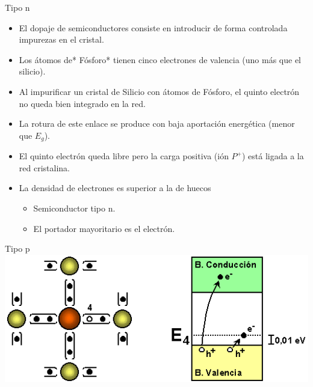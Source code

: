 \documentclass[xcolor={usenames,svgnames,dvipsnames}]{beamer}
\begin{document}
\begin{frame}[label=sec-1-3-3]{Tipo n}
\begin{itemize}
\item El \alert{dopaje de semiconductores} consiste en introducir de forma
controlada impurezas en el cristal.

\item Los átomos de* Fósforo* tienen cinco electrones de valencia (uno más
que el silicio).

\item Al impurificar un cristal de Silicio con átomos de Fósforo, el quinto
electrón no queda bien integrado en la red.

\item La rotura de este enlace se produce con \alert{baja aportación energética}
   (menor que $E_{g}$).

\item El \alert{quinto electrón queda libre pero la carga positiva (ión $P^{+}$)
está ligada} a la red cristalina.

\item La \alert{densidad de electrones es superior a la de huecos}

\begin{itemize}
\item Semiconductor \alert{tipo n}.

\item El \alert{portador mayoritario} es el \alert{electrón}.
\end{itemize}
\end{itemize}
\end{frame}

\begin{frame}[label=sec-1-3-4]{Tipo p}
\includegraphics[width=.9\linewidth]{../figs/Semiconductor_tipo_p.png}
\end{frame}
\end{document}
